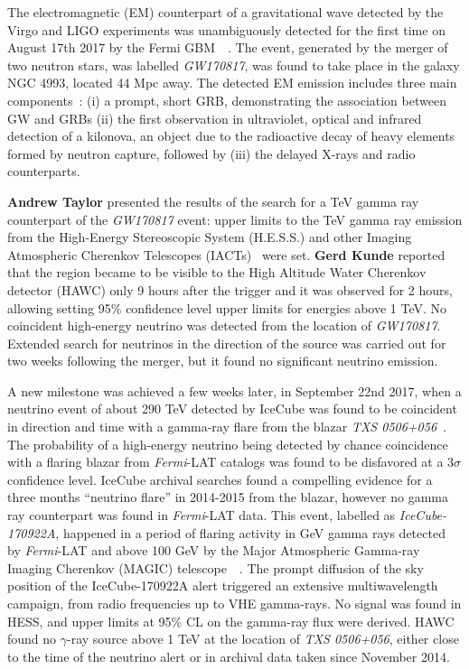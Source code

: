\documentclass{PoS}
\begin{document}
The  electromagnetic (EM) counterpart of a gravitational wave detected by the Virgo and LIGO  experiments was unambiguously detected for the first time on August 17th 2017 by the Fermi GBM~\cite{Gold2017}~\cite{Abbott2017}. 
The event, generated by the merger of two neutron stars, was
labelled \textit{GW170817}, was found to take place in the galaxy NGC 4993, located 44 Mpc away. The detected EM emission includes three main components~\cite{TheMMpaper}: (i) a prompt, short GRB, demonstrating the association between GW and GRBs (ii) the first observation in ultraviolet, optical and infrared detection of a  kilonova, an object  due to the radioactive decay of heavy elements formed by neutron capture, followed by (iii) the delayed X-rays and radio counterparts. 

{\bf Andrew Taylor} presented the results of the search for a TeV gamma ray counterpart of the \textit{GW170817} event: upper limits to the TeV gamma ray emission from the High-Energy Stereoscopic System (H.E.S.S.)
and other Imaging Atmospheric Cherenkov Telescopes (IACTs)~\cite{TheMMpaper} were set.  {\bf Gerd Kunde} reported that the region became to be visible
to the High Altitude Water Cherenkov detector (HAWC)
only 9 hours after the trigger and it was observed for 2 hours, allowing setting 95$\%$ confidence level upper limits for energies above 1 TeV. 
No coincident high-energy neutrino was detected  from the location of \textit{GW170817}. Extended search for neutrinos in the direction of the source was carried out for two weeks following the merger, but it found no significant neutrino emission. 


A new milestone was achieved a few weeks later, in September 22nd 2017, when a  neutrino event of about 290 TeV detected by IceCube was found to be coincident in direction and time with a gamma-ray flare from the blazar \textit{TXS 0506+056}~\cite{IceCube:2018dnn}.
The probability of a high-energy neutrino being detected by chance coincidence with a flaring blazar from \textit{Fermi}-LAT catalogs was found to be disfavored at a 3$\sigma$ confidence level. IceCube archival searches  found a compelling evidence for a three months ``neutrino flare'' in 2014-2015 from the blazar, however no gamma ray  counterpart was found in \textit{Fermi}-LAT data. This event, labelled as \textit{IceCube-170922A}, happened in a period of flaring activity in GeV gamma rays detected by \textit{Fermi}-LAT and above 100 GeV by the Major Atmospheric Gamma-ray Imaging Cherenkov (MAGIC) telescope~\cite{IceCube:2018cha}~\cite{MAGIC}.  The prompt diffusion of the sky position of the IceCube-170922A alert triggered an extensive multiwavelength campaign, from radio frequencies up to VHE gamma-rays. No signal was found in HESS, and upper limits at 95$\%$ CL on the gamma-ray flux were derived. HAWC found no $\gamma$-ray source above 1 TeV at the location of 
\textit{TXS 0506+056}, either close to the time of the neutrino alert or in archival data taken since November 2014.
\end{document}
